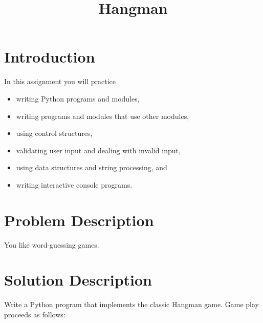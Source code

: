 \documentclass[12pt]{article}
\title{Hangman}
\author{}
\date{}
\begin{document}
\maketitle
\vspace{-1in}
\section{Introduction}

In this assignment you will practice
\begin{itemize}
\itemsep0em
\item writing Python programs and modules,
\item writing programs and modules that use other modules,
\item using control structures,
\item validating user input and dealing with invalid input,
\item using data structures and string processing, and
\item writing interactive console programs.
\end{itemize}

\section{Problem Description}

You like word-guessing games.

\section{Solution Description}

Write a Python program that implements the classic Hangman game.  Game play proceeds as follows:
\end{document}
